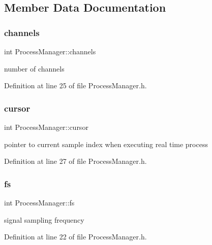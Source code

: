 \subsection{Member Data Documentation}
\mbox{\label{class_process_manager_a325109138cabf342e5beacf7af67480b}} 
\subsubsection{\texorpdfstring{channels}{channels}}
{\footnotesize\ttfamily int Process\+Manager\+::channels}

number of channels 

Definition at line 25 of file Process\+Manager.\+h.

\mbox{\label{class_process_manager_a337af1b32b2f6bf94ed98ef98e6d1226}} 
\subsubsection{\texorpdfstring{cursor}{cursor}}
{\footnotesize\ttfamily int Process\+Manager\+::cursor}

pointer to current sample index when executing real time process 

Definition at line 27 of file Process\+Manager.\+h.

\mbox{\label{class_process_manager_ae7ce9ead957c4f78d74206baf1837a59}} 
\subsubsection{\texorpdfstring{fs}{fs}}
{\footnotesize\ttfamily int Process\+Manager\+::fs}

signal sampling frequency 

Definition at line 22 of file Process\+Manager.\+h.

\mbox{\label{class_process_manager_aafb2937f6a2f261b1581917ba872ba9b}} 
